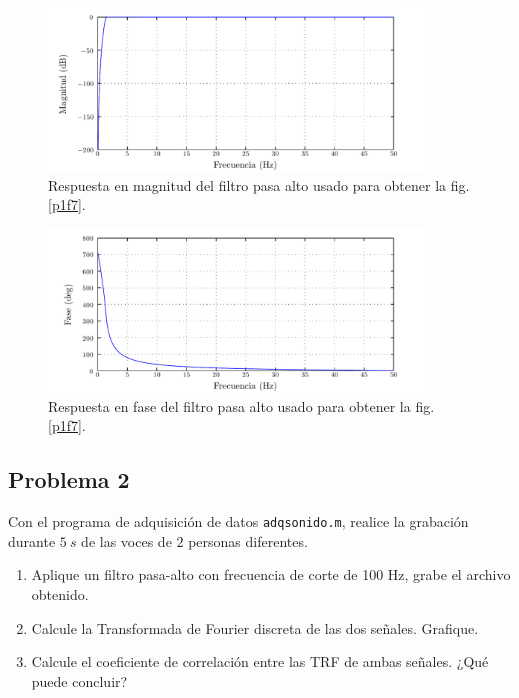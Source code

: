 \documentclass[a4paper,12pt,final]{article}
\begin{document}
      \begin{figure}[H]
        \begin{center}
          \caption{Respuesta en magnitud del filtro pasa alto usado para obtener la fig. \ref{p1f7}.}
          \label{p1f9}
          \vspace{-1em}
          \includegraphics[width=0.9\textwidth]{./laboratorio_5/problema01_highpass_filter_magnitude.pdf}
        \end{center}
      \end{figure}

      \begin{figure}[H]
        \begin{center}
          \caption{Respuesta en fase del filtro pasa alto usado para obtener la fig. \ref{p1f7}.}
          \label{p1f10}
          \vspace{-1em}
          \includegraphics[width=0.9\textwidth]{./laboratorio_5/problema01_highpass_filter_phase.pdf}
        \end{center}
      \end{figure}

  \newpage
  \subsection*{Problema 2}
    \noindent Con el programa de adquisición de datos \texttt{adqsonido.m}, realice
      la grabación durante $5\ s$ de las voces de $2$ personas diferentes.

      \begin{enumerate}[label=\alph*)]
        \item Aplique un filtro pasa-alto con frecuencia de corte de 100 Hz,
              grabe el archivo obtenido.
        \item Calcule la Transformada de Fourier discreta de las dos señales.
              Grafique.
        \item Calcule el coeficiente de correlación entre las TRF de ambas
              señales. ¿Qué puede concluir?
      \end{enumerate}
\end{document}
